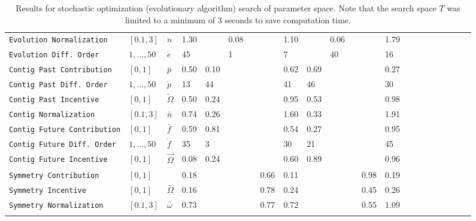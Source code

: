 \documentclass[twocolumn]{article}
\begin{document}
\begin{table}[h]
{\begin{tabular}{llll@{}llllllllllllllllll@{}}
		\texttt{Evolution Normalization}    & $[0.1,3]$         &    $\dot n$        & 1.30  &      & 0.08 &      &      & 1.10 &      & 0.06 &      &      & 1.79 &  \\
		\texttt{Evolution Diff. Order}      & $1,\ldots,50$     &    $\dot e$        & 45    &      & 1    &      &      & 7    &      & 40   &      &      & 16   &  \\ \midrule
		\texttt{Contig Past Contribution}   & $[0,1]$           &     $\bar p$       & 0.50  & 0.10 &      &      &      & 0.62 & 0.69 &      &      &      & 0.27 &  \\
		\texttt{Contig Past Diff. Order}    & $1,\ldots,50$     &    $\dot p$        & 13    & 44   &      &      &      & 41   & 46   &      &      &      & 30   &  \\
		\texttt{Contig Past Incentive}      & $[0,1]$           &    $\overleftarrow{\Omega}$        & 0.50  & 0.24 &      &      &      & 0.95 & 0.53 &      &      &      & 0.98 &  \\
		\texttt{Contig Normalization}       & $[0.1,3]$         &     $\bar n$       & 0.74  & 0.26 &      &      &      & 1.60 & 0.33 &      &      &      & 1.91 &  \\
		\texttt{Contig Future Contribution} & $[0,1]$           &    $\bar f$        & 0.59  & 0.81 &      &      &      & 0.54 & 0.27 &      &      &      & 0.95 &  \\
		\texttt{Contig Future Diff. Order}  & $1,\ldots,50$     &   $\dot f$         & 35    & 3    &      &      &      & 30   & 21   &      &      &      & 45   &  \\
		\texttt{Contig Future Incentive}    & $[0,1]$           &   $\overrightarrow{\Omega}$         & 0.08  & 0.24 &      &      &      & 0.60 & 0.89 &      &      &      & 0.96 &  \\ \midrule
		\texttt{Symmetry Contribution}      & $[0,1]$           &            & 0.18  &      &      &      & 0.66 & 0.11 &      &      &      & 0.98 & 0.19 &  \\
		\texttt{Symmetry Incentive}         & $[0,1]$           &    $\bar \Omega$        & 0.16  &      &      &      & 0.78 & 0.24 &      &      &      & 0.45 & 0.26 &  \\
		\texttt{Symmetry Normalization}     & $[0.1,3]$         &  $\bar \omega$         & 0.73  &      &      &      & 0.77 & 0.72 &      &      &      & 0.55 & 1.09 &  \\ \bottomrule
		                                    &                   &
	\end{tabular}
}
	\caption{Results for stochastic optimization (evolutionary algorithm) search of parameter space. Note that the search space $T$ was limited to a minimum of $3$ seconds to save computation time.  }
	\label{tab:parameters}
\end{table}
\end{document}
